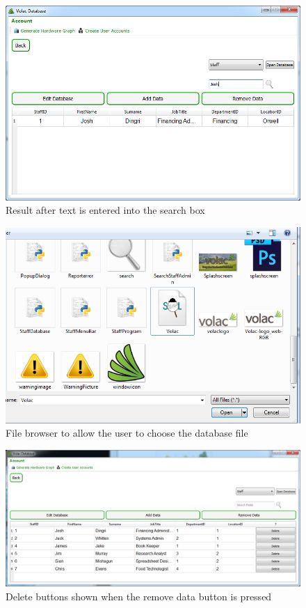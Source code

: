 \begin{figure}[H]
    \includegraphics[width=\textwidth]{./Maintenance/Images/Searched.png}
    \caption{Result after text is entered into the search box} \label{fig:Searched}
\end{figure}

\begin{figure}[H]
    \includegraphics[width=\textwidth]{./Maintenance/Images/filebrowser.png}
    \caption{File browser to allow the user to choose the database file} \label{fig:filebrowser}
\end{figure}

\begin{figure}[H]
    \includegraphics[width=\textwidth]{./Maintenance/Images/deletingdata.png}
    \caption{Delete buttons shown when the remove data button is pressed} \label{fig:deletingdata}
\end{figure}

